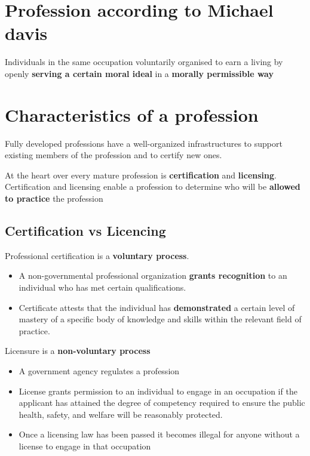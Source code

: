 \documentclass{article}
\begin{document}
\tableofcontents

\newpage

\section{Profession according to Michael davis}

\begin{flushleft}
Individuals in the same
occupation voluntarily organised to earn a living by
openly \textbf{serving a certain moral ideal} in a \textbf{morally
permissible way}
\end{flushleft}

\section{Characteristics of a profession}

\begin{flushleft}
Fully developed professions have a well-organized infrastructures to support existing members of the profession and to certify new ones.

\bigskip
At the heart over every mature profession is \textbf{certification} and \textbf{licensing}. Certification and licensing enable a profession to determine who will be \textbf{allowed to practice} the profession
\end{flushleft}

\subsection{Certification vs Licencing}
\begin{flushleft}
Professional certification is a \textbf{voluntary process}.
\begin{itemize}
  \item A non-governmental professional organization \textbf{grants recognition} to an individual who has met certain qualifications.
  \item Certificate attests that the individual has \textbf{demonstrated} a certain level of mastery of a specific body of knowledge and skills within the relevant field of practice.
\end{itemize}
Licensure is a \textbf{non-voluntary process}
\begin{itemize}
  \item A government agency regulates a profession
  \item License grants permission to an individual to engage in an occupation if the applicant has attained the degree of competency required to ensure the public health, safety, and welfare will be reasonably protected.
  \item Once a licensing law has been passed it becomes illegal for anyone without a license to engage in that occupation
\end{itemize}
\end{flushleft}
\end{document}
